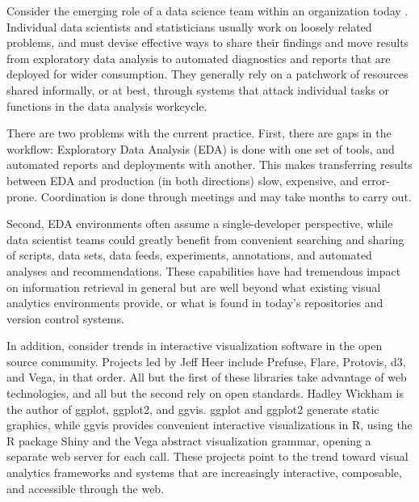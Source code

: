 

\maketitle


Consider the emerging role of a data science team within an
organization today \cite{Keim:2008:VAS}.
%
Individual data scientists and statisticians usually work on loosely
related problems, and must devise effective ways to share their findings
and move results from exploratory data analysis to automated diagnostics
and reports that are deployed for wider consumption.
They generally rely on a patchwork of resources shared informally,
or at best, through systems that attack individual tasks or functions
in the data analysis workcycle. %

There are two problems with the current practice. First, there are
gaps in the workflow: Exploratory Data Analysis (EDA) is done with one
set of tools, and automated reports and deployments with another. This
makes transferring results between EDA and production (in both
directions) slow, expensive, and error-prone. Coordination is done
through meetings and may take months to carry out.

Second, EDA environments often assume a single-developer perspective,
while data scientist teams could greatly benefit from convenient searching
and sharing of scripts, data sets, data feeds, experiments, annotations,
and automated analyses and recommendations. These capabilities have had
tremendous impact on information retrieval in general but are well
beyond what existing visual analytics environments provide, or what
is found in today's repositories and version control
systems.\cite{Koren:2009:FIT}

In addition, consider trends in interactive visualization software
in the open source community. Projects led by Jeff Heer
include Prefuse, Flare, Protovis, d3, and Vega, in that order.
All but the first of these libraries take advantage of web technologies,
and all but the second rely on open standards. Hadley Wickham is the
author of ggplot, ggplot2, and ggvis. ggplot and ggplot2 generate
static graphics, while ggvis provides convenient interactive visualizations
in R, using the R package Shiny and the Vega abstract visualization grammar,
opening a separate web server for each call. These projects point to
the trend toward visual analytics frameworks and systems that are
increasingly interactive, composable, and accessible through the web.

